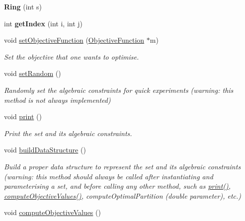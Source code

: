 \begin{DoxyCompactItemize}
\item 
\hypertarget{classRing_aa2a51e6c57c5073d25f5e077b840feb8}{{\bfseries Ring} (int s)}\label{classRing_aa2a51e6c57c5073d25f5e077b840feb8}

\item 
\hypertarget{classRing_aa311bb3fbd3c7bcca0cca4112d448d40}{int {\bfseries get\-Index} (int i, int j)}\label{classRing_aa311bb3fbd3c7bcca0cca4112d448d40}

\item 
void \hyperlink{classRing_af9bc7f0b325cbd2b6284aadeacdee6fb}{set\-Objective\-Function} (\hyperlink{classObjectiveFunction}{Objective\-Function} $\ast$m)
\begin{DoxyCompactList}\small\item\em Set the objective that one wants to optimise. \end{DoxyCompactList}\item 
\hypertarget{classRing_adc68e6141c7957391e5290749a4bb9c1}{void \hyperlink{classRing_adc68e6141c7957391e5290749a4bb9c1}{set\-Random} ()}\label{classRing_adc68e6141c7957391e5290749a4bb9c1}

\begin{DoxyCompactList}\small\item\em Randomly set the algebraic constraints for quick experiments (warning\-: this method is not always implemented) \end{DoxyCompactList}\item 
\hypertarget{classRing_aecf5e7fe540e174cb718cd167f61c87e}{void \hyperlink{classRing_aecf5e7fe540e174cb718cd167f61c87e}{print} ()}\label{classRing_aecf5e7fe540e174cb718cd167f61c87e}

\begin{DoxyCompactList}\small\item\em Print the set and its algebraic constraints. \end{DoxyCompactList}\item 
\hypertarget{classRing_a263c2e8e2f934f15246b17b60017460b}{void \hyperlink{classRing_a263c2e8e2f934f15246b17b60017460b}{build\-Data\-Structure} ()}\label{classRing_a263c2e8e2f934f15246b17b60017460b}

\begin{DoxyCompactList}\small\item\em Build a proper data structure to represent the set and its algebraic constraints (warning\-: this method should always be called after instantiating and parameterising a set, and before calling any other method, such as \hyperlink{classRing_aecf5e7fe540e174cb718cd167f61c87e}{print()}, \hyperlink{classRing_afe95373425bb2f3c0f0d3cfbea5c96e8}{compute\-Objective\-Values()}, compute\-Optimal\-Partition (double parameter), etc.) \end{DoxyCompactList}\item 
\hypertarget{classRing_afe95373425bb2f3c0f0d3cfbea5c96e8}{void \hyperlink{classRing_afe95373425bb2f3c0f0d3cfbea5c96e8}{compute\-Objective\-Values} ()}\label{classRing_afe95373425bb2f3c0f0d3cfbea5c96e8}


\end{DoxyCompactItemize}
